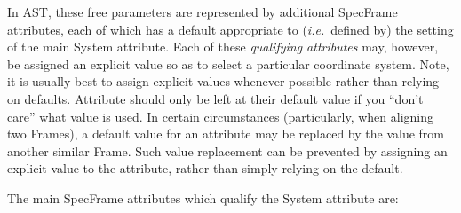 \documentclass[twoside,11pt]{starlink}
\begin{document}
In AST, these free parameters are represented by additional SpecFrame
attributes, each of which has a default appropriate to
(\emph{i.e.}\ defined by) the setting of the main System
attribute. Each of these \emph{qualifying attributes} may, however, be
assigned an explicit value so as to select a particular coordinate
system. Note, it is usually best to assign explicit
values whenever possible rather than relying on defaults. Attribute
should only be left at their default value if you ``don't care'' what
value is used. In certain circumstances (particularly, when aligning two
Frames), a default value for an attribute may be replaced by the value
from another similar Frame. Such value replacement can be prevented by
assigning an explicit value to the attribute, rather than simply relying on
the default.


The main SpecFrame attributes which qualify the System attribute are:
\end{document}

